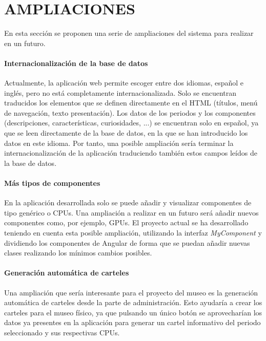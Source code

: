 \newpage
\section{AMPLIACIONES} 
En esta sección se proponen una serie de ampliaciones del sistema para realizar en un futuro.
\paragraph*{Internacionalización de la base de datos}
Actualmente, la aplicación web permite escoger entre dos idiomas, español e inglés, pero no está completamente internacionalizada. Solo se encuentran traducidos los elementos que se definen directamente en el HTML (títulos, menú de navegación, texto presentación). Los datos de los periodos y los componentes (descripciones, características, curiosidades, ...) se encuentran solo en español, ya que se leen directamente de la base de datos, en la que se han introducido los datos en este idioma. Por tanto, una posible ampliación sería terminar la internacionalización de la aplicación traduciendo también estos campos leídos de la base de datos.

\paragraph*{Más tipos de componentes}
En la aplicación desarrollada solo se puede añadir y visualizar componentes de tipo genérico o CPUs. Una ampliación a realizar en un futuro será añadir nuevos componentes como, por ejemplo, GPUs. El proyecto actual se ha desarrollado teniendo en cuenta esta posible ampliación, utilizando la interfaz \textit{MyComponent} y dividiendo los componentes de Angular de forma que se puedan añadir nuevas clases realizando los mínimos cambios posibles.

\paragraph*{Generación automática de carteles}
Una ampliación que sería interesante para el proyecto del museo es la generación automática de carteles desde la parte de administración. Esto ayudaría a crear los carteles para el museo físico, ya que pulsando un único botón se aprovecharían los datos ya presentes en la aplicación para generar un cartel informativo del periodo seleccionado y sus respectivas CPUs.


% 
%

